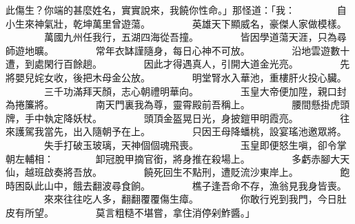 \begin{pinyinscope}
{此傷生？你端的甚麼姓名，實實說來，我饒你性命。」那怪道：「我：
　　　　自小生來神氣壯，乾坤萬里曾遊蕩。
　　　　英雄天下顯威名，豪傑人家做模樣。
　　　　萬國九州任我行，五湖四海從吾撞。
　　　　皆因學道蕩天涯，只為尋師遊地曠。
　　　　常年衣缽謹隨身，每日心神不可放。
　　　　沿地雲遊數十遭，到處閑行百餘趟。
　　　　因此才得遇真人，引開大道金光亮。
　　　　先將嬰兒姹女收，後把木母金公放。
　　　　明堂腎水入華池，重樓肝火投心臟。
　　　　三千功滿拜天顏，志心朝禮明華向。
　　　　玉皇大帝便加陞，親口封為捲簾將。
　　　　南天門裏我為尊，靈霄殿前吾稱上。
　　　　腰間懸掛虎頭牌，手中執定降妖杖。
　　　　頭頂金盔晃日光，身披鎧甲明霞亮。
　　　　往來護駕我當先，出入隨朝予在上。
　　　　只因王母降蟠桃，設宴瑤池邀眾將。
　　　　失手打破玉玻璃，天神個個魂飛喪。
　　　　玉皇即便怒生嗔，卻令掌朝左輔相：
　　　　卸冠脫甲摘官銜，將身推在殺場上。
　　　　多虧赤腳大天仙，越班啟奏將吾放。
　　　　饒死回生不點刑，遭貶流沙東岸上。
　　　　飽時困臥此山中，餓去翻波尋食餉。
　　　　樵子逢吾命不存，漁翁見我身皆喪。
　　　　來來往往吃人多，翻翻覆覆傷生瘴。
　　　　你敢行兇到我門，今日肚皮有所望。
　　　　莫言粗糙不堪嘗，拿住消停剁鮓醬。」

}
\end{pinyinscope}
